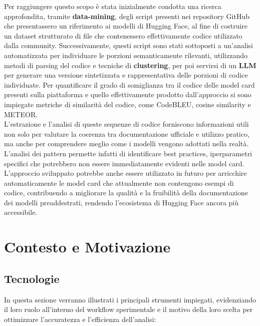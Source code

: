 \documentclass{article}
\begin{document}
Per raggiungere questo scopo è stata inizialmente condotta una ricerca approfondita, tramite \textbf{data-mining}, degli script presenti nei repository GitHub che presentassero un riferimento ai modelli di Hugging Face, al fine di costruire un dataset strutturato di file che contenessero effettivamente codice utilizzato dalla community. Successivamente, questi script sono stati sottoposti a un’analisi automatizzata per individuare le porzioni semanticamente rilevanti, utilizzando metodi di parsing del codice e tecniche di \textbf{clustering}, per poi servirsi di un \textbf{LLM} per generare una versione sintetizzata e rappresentativa delle porzioni di codice individuate. Per quantificare il grado di somiglianza tra il codice delle model card presenti sulla piattaforma e quello effettivamente prodotto dall'approccio si sono impiegate metriche di similarità del codice, come CodeBLEU, cosine similarity e METEOR.\\
L’estrazione e l’analisi di queste sequenze di codice forniscono informazioni utili non solo per valutare la coerenza tra documentazione ufficiale e utilizzo pratico, ma anche per comprendere meglio come i modelli vengono adottati nella realtà. L’analisi dei pattern permette infatti di identificare best practices, iperparametri specifici che potrebbero non essere immediatamente evidenti nelle model card.
L’approccio sviluppato potrebbe anche essere utilizzato in futuro per arricchire automaticamente le model card che attualmente non contengono esempi di codice, contribuendo a migliorare la qualità e la fruibilità della documentazione dei modelli preaddestrati, rendendo l’ecosistema di Hugging Face ancora più accessibile.

\section{Contesto e Motivazione}
\subsection{Tecnologie}
In questa sezione verranno illustrati i principali strumenti impiegati, evidenziando il loro ruolo all'interno del workflow sperimentale e il motivo della loro scelta per ottimizzare l'accuratezza e l'efficienza dell’analisi:
\end{document}
